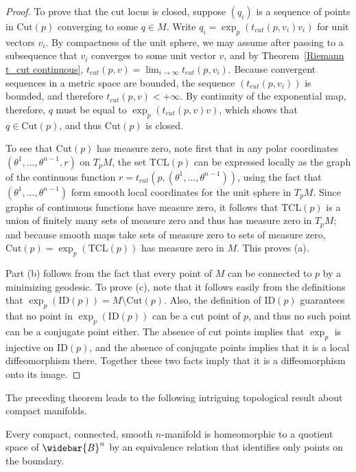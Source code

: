\begin{proof}
To prove that the cut locus is closed, suppose $(q_i)$ is a sequence of points in $\mathrm{Cut}(p)$ converging to some $q\in M$. Write $q_i=\exp_p(t_{cut}(p,v_i)v_i)$ 
for unit vectors $v_i$. By compactness of the unit sphere, we may assume after passing to a subsequence that $v_i$ converges to some unit vector $v$, and by 
Theorem~\ref{Riemann t_cut continuous}, $t_{cut}(p,v)=\lim_{i\to\infty}t_{cut}(p,v_i)$. Because convergent sequences in a metric space are bounded, the sequence 
$(t_{cut}(p,v_i))$ is bounded, and therefore $t_{cut}(p,v)<+\infty$. By continuity of the exponential map, therefore, $q$ must be equal to $\exp_p(t_{cut}(p,v)v)$, 
which shows that $q\in\mathrm{Cut}(p)$, and thus $\mathrm{Cut}(p)$ is closed.\par
To see that $\mathrm{Cut}(p)$ has measure zero, note first that in any polar coordinates $(\theta^1,\dots,\theta^{n-1},r)$ on $T_pM$, the set $\mathrm{TCL}(p)$ can be 
expressed locally as the graph of the continuous function $r=t_{cut}(p,(\theta^1,\dots,\theta^{n-1}))$, using the fact that $(\theta^1,\dots,\theta^{n-1})$ form smooth 
local coordinates for the unit sphere in $T_pM$. Since graphs of continuous functions have measure zero, it follows that $\mathrm{TCL}(p)$ is a union of finitely many 
sets of measure zero and thus has measure zero in $T_pM$; and because smooth maps take sets of measure zero to sets of measure zero, $\mathrm{Cut}(p)=\exp_p(\mathrm{TCL}(p))$ 
has measure zero in $M$. This proves (a).\par
Part (b) follows from the fact that every point of $M$ can be connected to $p$ by a minimizing geodesic. To prove (c), note that it follows easily from the 
definitions that $\exp_p(\mathrm{ID}(p))=M\setminus\mathrm{Cut}(p)$. Also, the definition of $\mathrm{ID}(p)$ guarantees that no point in $\exp_p(\mathrm{ID}(p))$ can 
be a cut point of $p$, and thus no such point can be a conjugate point either. The absence of cut points implies that $\exp_p$ is injective on $\mathrm{ID}(p)$, and the absence of conjugate points implies that it is a local diffeomorphism there. Together these two facts imply that it is a diffeomorphism onto its image.
\end{proof}
The preceding theorem leads to the following intriguing topological result about compact manifolds.
\begin{corollary}
Every compact, connected, smooth $n$-manifold is homeomorphic to a quotient space of $\widebar{B}^n$ by an equivalence relation that identifies only points on the boundary.
\end{corollary}
